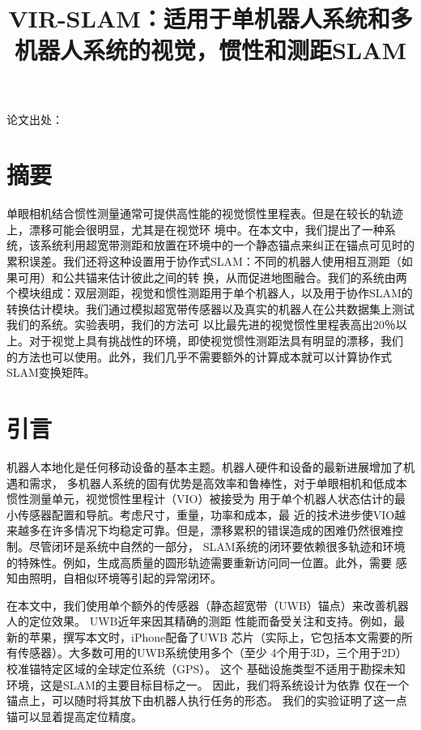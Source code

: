 
\begin{translation}
\label{cha:translation}

\title{VIR-SLAM：适用于单机器人系统和多机器人系统的视觉，惯性和测距SLAM}
\maketitle

论文出处：\cite{this}

\section{摘要}

单眼相机结合惯性测量通常可提供高性能的视觉惯性里程表。但是在较长的轨迹上，漂移可能会很明显，尤其是在视觉环
境中。在本文中，我们提出了一种系统，该系统利用超宽带测距和放置在环境中的一个静态锚点来纠正在锚点可见时的
累积误差。我们还将这种设置用于协作式SLAM：不同的机器人使用相互测距（如果可用）和公共锚来估计彼此之间的转
换，从而促进地图融合。我们的系统由两个模块组成：双层测距，视觉和惯性测距用于单个机器人，以及用于协作SLAM的
转换估计模块。我们通过模拟超宽带传感器以及真实的机器人在公共数据集上测试我们的系统。实验表明，我们的方法可
以比最先进的视觉惯性里程表高出20％以上。对于视觉上具有挑战性的环境，即使视觉惯性测距法具有明显的漂移，我们
的方法也可以使用。此外，我们几乎不需要额外的计算成本就可以计算协作式SLAM变换矩阵。


\section{引言}

机器人本地化是任何移动设备的基本主题。机器人硬件和设备的最新进展增加了机遇和需求，
多机器人系统的固有优势是高效率和鲁棒性，对于单眼相机和低成本惯性测量单元，视觉惯性里程计（VIO）被接受为
用于单个机器人状态估计的最小传感器配置和导航。考虑尺寸，重量，功率和成本\cite{delmerico2018benchmark}，最
近的技术进步\cite{lupton2011visual, forster2016manifold, qin2018vins}使VIO越
来越多在许多情况下均稳定可靠。但是，漂移累积的错误造成的困难仍然很难控制。尽管闭环是系统中自然的一部分，
SLAM系统的闭环要依赖很多轨迹和环境的特殊性。例如，生成高质量的圆形轨迹需要重新访问同一位置。此外，需要
感知由照明，自相似环境等引起的异常闭环。

在本文中，我们使用单个额外的传感器（静态超宽带（UWB）锚点）来改善机器人的定位效果。 UWB近年来因其精确的测距
性能而备受关注和支持。例如，最新的苹果，撰写本文时，iPhone配备了UWB
芯片（实际上，它包括本文需要的所有传感器）。大多数可用的UWB系统使用多个（至少
4个用于3D，三个用于2D）校准锚特定区域的全球定位系统（GPS）。 这个
基础设施类型不适用于勘探未知环境，这是SLAM的主要目标目标之一。 因此，我们将系统设计为依靠
仅在一个锚点上，可以随时将其放下由机器人执行任务的形态。 我们的实验证明了这一点锚可以显着提高定位精度。



\end{translation}
